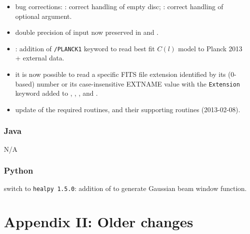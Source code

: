 \documentclass[12pt,twoside]{article}
\newcommand{\linklatexhtml}[3]{%
\latexhtml{\htmladdnormallink{#1}{#2}}{\htmladdnormallink{#1}{#3}}}
\begin{document}
\subsubsection[IDL]{\linklatexhtml{IDL}{idl.pdf}{idl.htm}}
\begin{itemize}
	\item bug corrections: 
	: correct handling of empty disc; 
	: correct handling of optional argument.

	\item double precision of input now preserved in
	 and 
	.

	\item {}: addition of 
	{\tt /PLANCK1} keyword
	to read best fit $C(l)$ model to Planck 2013 + external data.

	\item it is now possible to read a specific FITS file extension identified by its
	(0-based) number or its case-insensitive EXTNAME value with the {\tt Extension}
	keyword added to 
	,
	,
	,
	 and 
	.

	\item update of the required
	routines, and their supporting 
	routines (2013-02-08).
\end{itemize}

%
\subsubsection[Java]{Java}
N/A%
\subsubsection[Python]{Python}
	switch to {\tt healpy 1.5.0}: addition of 
to generate Gaussian beam window function.

\section{Appendix II: Older changes}
\end{document}
